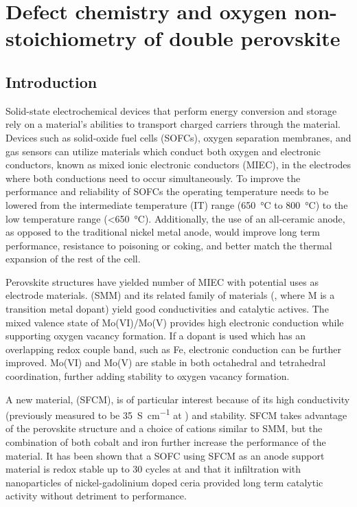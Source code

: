 
\chapter[Defect chemistry and oxygen non-stoichiometry of \ce{SrFe_{0.2}Co_{0.4}Mo_{0.4}O_{3-\delta}}]{Defect chemistry and oxygen non-stoichiometry of double perovskite }

\section{Introduction}
    Solid-state electrochemical devices that perform energy conversion and storage rely on a material's abilities to transport charged carriers through the material.
    Devices such as solid-oxide fuel cells (SOFCs), oxygen separation membranes, and gas sensors can utilize materials which conduct both oxygen and electronic conductors, known as mixed ionic electronic conductors (MIEC), in the electrodes where both conductions need to occur simultaneously.\cite{Huang2006}
    To improve the performance and reliability of SOFCs the operating temperature needs to be lowered from the intermediate temperature (IT) range (\SI{650}{\celsius} to \SI{800}{\celsius}) to the low temperature range (\textless\SI{650}{\celsius}).\cite{Wachsman2011a}
    Additionally, the use of an all-ceramic anode, as opposed to the traditional nickel metal anode, would improve long term performance, resistance to poisoning or coking, and better match the thermal expansion of the rest of the cell.\cite{Goodenough2007}

    Perovskite structures have yielded number of MIEC with potential uses as electrode materials. \cite{Yamamoto1987,Anderson1992,Ishihara2009}
     (SMM) and its related family of materials (, where M is a transition metal dopant) yield good conductivities and catalytic actives.\cite{Huang2009}
    The mixed valence state of Mo(VI)/Mo(V) provides high electronic conduction while supporting oxygen vacancy formation.\cite{Huang2006a}
    If a dopant is used which has an overlapping redox couple band, such as Fe, electronic conduction can be further improved.
    Mo(VI) and Mo(V) are stable in both octahedral and tetrahedral coordination, further adding stability to oxygen vacancy formation.\cite{Bernuy-Lopez2007}

    A new material,  (SFCM), is of particular interest because of its high conductivity (previously measured to be \SI{35}{S\per\centi\meter} at ) and stability.\cite{Pan}
    SFCM takes advantage of the perovskite structure and a choice of cations similar to SMM, but the combination of both cobalt and iron further increase the performance of the material.
    It has been shown that a SOFC using SFCM as an anode support material is redox stable up to 30 cycles at  and that it infiltration with nanoparticles of nickel-gadolinium doped ceria provided long term catalytic activity without detriment to performance.\cite{Hussaina,Hussain}

